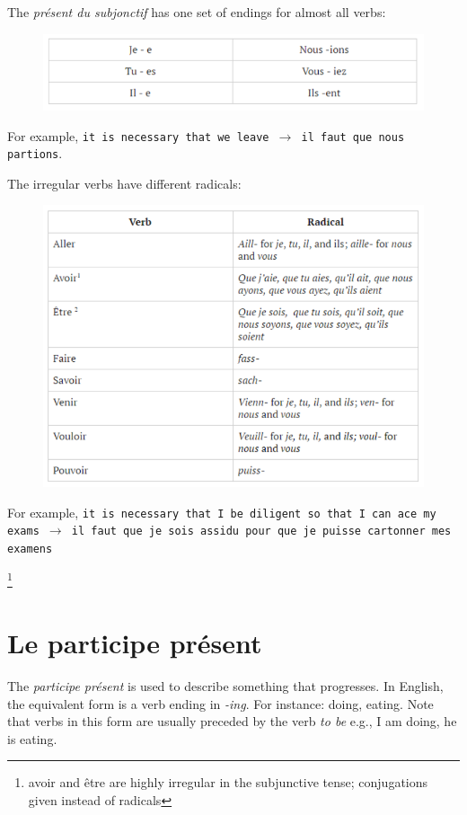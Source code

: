 \documentclass[11pt, oneside]{book}
\begin{document}
{The \textit{pr\'esent du subjonctif} has one set of endings for almost all verbs: \vspace{0.5\baselineskip}

\begin{figure}[H]
	\includegraphics[scale=0.6]{charts/subjonctifEndings.png}
\end{figure} \vspace{0.5\baselineskip}

For example, \texttt{it is necessary that we leave $\rightarrow$ il faut que nous partions}.

The irregular verbs have different radicals: 
\begin{figure}[H]
	\includegraphics[scale=0.6]{charts/subjonctifIrregulars.png}
\end{figure} \vspace{0.5\baselineskip}

For example, \texttt{it is necessary that I be diligent so that I can ace my exams $\rightarrow$ il faut que je sois assidu pour que je puisse cartonner mes examens} 	

{\let\thefootnote\relax\footnote{avoir and \^etre are highly irregular in the subjunctive tense; conjugations given instead of radicals}

\section{Le participe pr\'esent}
The \textit{participe pr\'esent} is used to describe something that progresses. In English, the equivalent form is a verb ending in \textit{-ing}. For instance: doing, eating. Note that verbs in this form are usually preceded by the verb \textit{to be} e.g., I am doing, he is eating. \vspace{0.5\baselineskip}

}}
\end{document}
